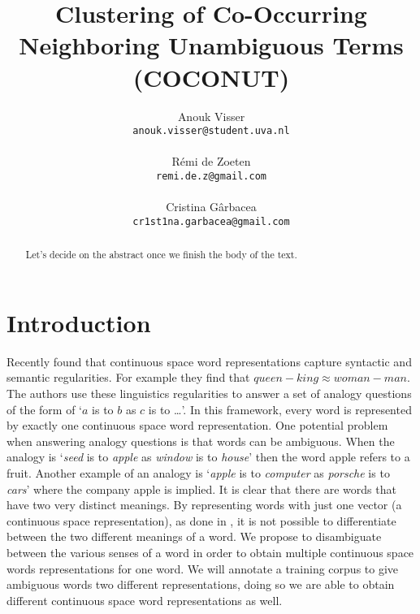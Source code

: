 \documentclass[11pt]{article}
\title{Clustering of Co-Occurring Neighboring Unambiguous Terms (COCONUT)}
\author{Anouk Visser \\
{\tt anouk.visser@student.uva.nl}\\
  \\\And
  R\'emi de Zoeten \\
  {\tt remi.de.z@gmail.com}\\
   \\\And
  Cristina G\^arbacea \\
  {\tt cr1st1na.garbacea@gmail.com}
  \\}
\date{}
\begin{document}
\maketitle
\begin{abstract}
Let's decide on the abstract once we finish the body of the text.
\end{abstract}

\section{Introduction}
Recently \cite{Mikolov:13} found that continuous space word representations capture syntactic and semantic regularities. For example they find that $\textit{queen} - \textit{king} \approx \textit{woman}  -\textit{man}$. The authors use these linguistics regularities to answer a set of analogy questions of the form of `$a$ is to $b$ as $c$ is to \dots'. In this framework, every word is represented by exactly one continuous space word representation. One potential problem when answering analogy questions is that words can be ambiguous. When the analogy is `\textit{seed} is to \textit{apple} as \textit{window} is to \textit{house}' then the word apple refers to a fruit. Another example of an analogy is `\textit{apple} is to \textit{computer} as \textit{porsche} is to \textit{cars}' where the company apple is implied. It is clear that there are words that have two very distinct meanings. By representing words with just one vector (a continuous space representation), as done in \cite{Mikolov:13}, it is not possible to differentiate between the two different meanings of a word. We propose to disambiguate between the various senses of a word in order to obtain multiple continuous space words representations for one word. We will annotate a training corpus to give ambiguous words two different representations, doing so we are able to obtain different continuous space word representations as well.
\end{document}
